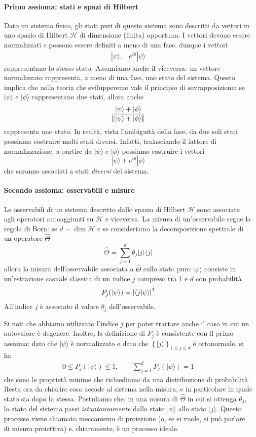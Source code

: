 \documentclass[a4paper, 11pt]{article}
\renewcommand{\H}{\mathcal{H}}
\renewcommand{\ket}[1]{| #1\rangle}
\renewcommand{\bra}[1]{\langle #1|}
\begin{document}
\paragraph{Primo assioma: stati e spazi di Hilbert}
Dato un sistema fisico, gli stati puri di questo sistema sono descritti da vettori in uno spazio di Hilbert $\H$ di dimensione (finita) opportuna. I vettori devono essere normalizzati e possono essere definiti a meno di una fase, dunque i vettori
\begin{align*}
	\ket{\psi},\,\,\,\,\,e^{i\theta}\ket{\psi}
\end{align*}
rappresentano lo stesso stato. Assumiamo anche il viceversa: un vettore normalizzato rappresenta, a meno di una fase, uno stato del sistema. Questo implica che nella teoria che svilupperemo vale il principio di sovrapposizione: se $\ket{\psi}$ e $\ket{\phi}$ rappresentano due stati, allora anche 
\[\frac{\ket{\psi}+\ket{\phi}}{\norm{\ket{\psi}+\ket{\phi}}}\]
rappresenta uno stato. In realtà, vista l'ambiguità della fase, da due soli stati possiamo costruire molti stati diversi. Infatti, tralasciando il fattore di normalizzazione, a partire da $\ket{\psi}$ e $\ket\phi$ possiamo costruire i vettori
\[\ket{\psi}+e^{i\theta}\ket{\phi}\]
che saranno associati a stati \textit{diversi} del sistema.
\paragraph{Secondo assioma: osservabili e misure} Le osservabili di un sistema descritto dallo spazio di Hilbert $\H$ sono associate agli operatori autoaggiunti su $\H$ e viceversa. La misura di un'osservabile segue la regola di Born: se $d=\dim\H$ e se consideriamo la decomposizione spettrale di un operatore $\hat{\Theta}$
\[\hat{\Theta}=\sum_{j=1}^{d}\theta_j\ket{j}\bra{j}\]
allora la misura dell'osservabile associata a $\hat{\Theta}$ sullo stato puro $\ket{\psi}$ consiste in un'estrazione casuale classica di un indice $j$ compreso tra 1 e $d$ con probabilità
\[P_j(\ket{\psi})=\left|\braket{j}{\psi}\right|^2\]
All'indice $j$ è associato il valore $\theta_j$ dell'osservabile.

Si noti che abbiamo utilizzato l'indice $j$ per poter trattare anche il caso in cui un autovalore è degenere. Inoltre, la definizione di $P_j$ è consistente con il primo assioma: dato che $\ket{\psi}$ è normalizzato e dato che $\left\{\ket{j}\right\}_{1\leq j\leq d}$ è ortonormale, si ha
\begin{align*}
0\leq P_j(\ket{\psi})\leq1,\,\,\,\,\,\,\,\,\,\,\,\,\sum_{j=1}^{d}P_j(\ket{\psi})=1
\end{align*}
che sono le proprietà minime che richiediamo da una distribuzione di probabilità. Resta ora da chiarire cosa accade al sistema nella misura, e in particolare in quale stato sia dopo la stessa. Postuliamo che, in una misura di $\hat{\Theta}$ in cui si ottenga $\theta_j$, lo stato del sistema passi \textit{istantaneamente} dallo stato $\ket{\psi}$ allo stato $\ket{j}$. Questo processo viene chiamato meccanismo di proiezione (o, se si vuole, si può parlare di misura proiettiva) e, chiaramente, è un processo ideale.
\end{document}

